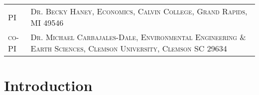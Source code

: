 \documentclass[11pt,a4paper]{article}
\begin{document}

\begin{table}
\begin{tabular}{lp{12cm}}
	\textsc{PI} &	\textsc{Dr. Becky Haney, Economics, Calvin College, Grand Rapids, MI 49546}	\\
	\textsc{co-PI} &			\textsc{Dr. Michael Carbajales-Dale, Environmental Engineering \& Earth Sciences, Clemson University, Clemson SC 29634} \\
\end{tabular}
\end{table}
\section{Introduction}
\end{document}
